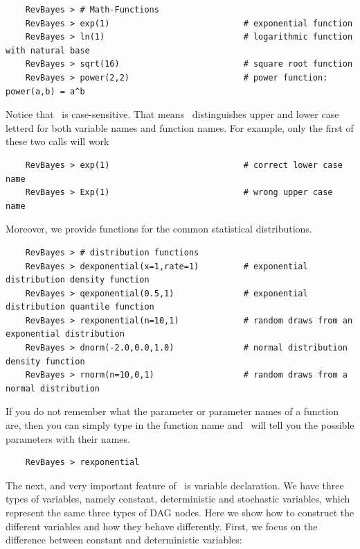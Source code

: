\documentclass[11pt]{article}
\begin{document}
{\tt \begin{snugshade*}
\begin{lstlisting}    
    RevBayes > # Math-Functions
    RevBayes > exp(1)                           # exponential function
    RevBayes > ln(1)                            # logarithmic function with natural base
    RevBayes > sqrt(16)                         # square root function 
    RevBayes > power(2,2)                       # power function: power(a,b) = a^b
\end{lstlisting}
\end{snugshade*}}
Notice that \Rev~is case-sensitive. That means \Rev~distinguishes upper and lower case letterd for both variable names and function names. For example, only the first of these two calls will work
{\tt \begin{snugshade*}
\begin{lstlisting}    
    RevBayes > exp(1)                           # correct lower case name
    RevBayes > Exp(1)                           # wrong upper case name
\end{lstlisting}
\end{snugshade*}}
Moreover, we provide functions for the common statistical distributions.
{\tt \begin{snugshade*}
\begin{lstlisting}    
    RevBayes > # distribution functions
    RevBayes > dexponential(x=1,rate=1)         # exponential distribution density function
    RevBayes > qexponential(0.5,1)              # exponential distribution quantile function
    RevBayes > rexponential(n=10,1)             # random draws from an exponential distribution
    RevBayes > dnorm(-2.0,0.0,1.0)              # normal distribution density function
    RevBayes > rnorm(n=10,0,1)                  # random draws from a normal distribution
\end{lstlisting}
\end{snugshade*}}
If you do not remember what the parameter or parameter names of a function are, then you can simply type in the function name and \RevBayes~will tell you the possible parameters with their names.
{\tt \begin{snugshade*}
\begin{lstlisting}    
    RevBayes > rexponential
\end{lstlisting}
\end{snugshade*}}

The next, and very important feature of \RevBayes~is variable declaration. 
We have three types of variables, namely constant, deterministic and stochastic variables, which represent the same three types of DAG nodes. 
Here we show how to construct the different variables and how they behave differently. 
First, we focus on the difference between constant and deterministic variables: 
\end{document}
